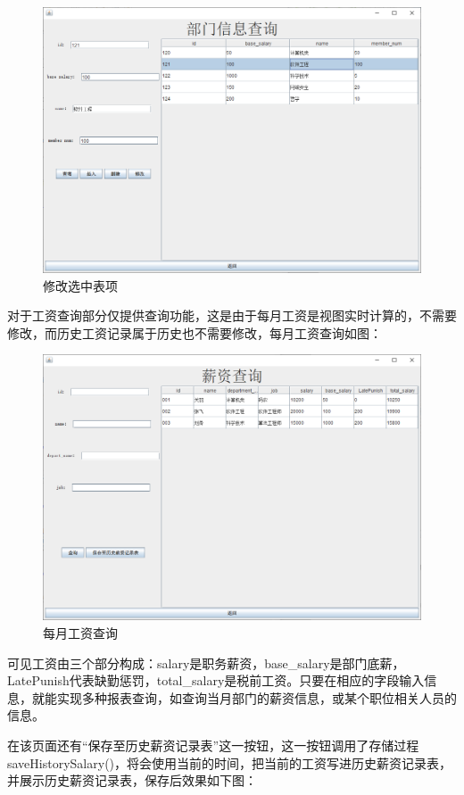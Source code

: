 \documentclass[withoutpreface,bwprint]{cumcmthesis} %
\begin{document}
\begin{figure}[H]
    \centering
    \includegraphics[width=1\linewidth]{change}
    \caption{修改选中表项}
\end{figure}
对于工资查询部分仅提供查询功能，这是由于每月工资是视图实时计算的，不需要修改，而历史工资记录属于历史也不需要修改，每月工资查询如图：
\begin{figure}[H]
    \centering
    \includegraphics[width=1\linewidth]{salary}
    \caption{每月工资查询}
\end{figure}
可见工资由三个部分构成：salary是职务薪资，base\_salary是部门底薪，LatePunish代表缺勤惩罚，total\_salary是税前工资。只要在相应的字段输入信息，就能实现多种报表查询，如查询当月部门的薪资信息，或某个职位相关人员的信息。 \par
在该页面还有“保存至历史薪资记录表”这一按钮，这一按钮调用了存储过程saveHistorySalary()，将会使用当前的时间，把当前的工资写进历史薪资记录表，并展示历史薪资记录表，保存后效果如下图：
\end{document}
